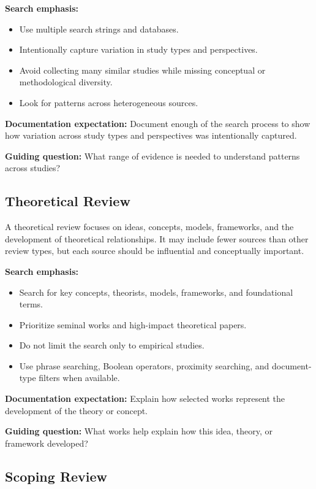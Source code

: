 \documentclass[11pt,letterpaper]{article}
\begin{document}
\textbf{Search emphasis:}

\begin{itemize}
  \item Use multiple search strings and databases.
  \item Intentionally capture variation in study types and perspectives.
  \item Avoid collecting many similar studies while missing conceptual or methodological diversity.
  \item Look for patterns across heterogeneous sources.
\end{itemize}

\textbf{Documentation expectation:} Document enough of the search process to show how variation across study types and perspectives was intentionally captured.

\textbf{Guiding question:} What range of evidence is needed to understand patterns across studies?

\subsection{Theoretical Review}

A theoretical review focuses on ideas, concepts, models, frameworks, and the development of theoretical relationships. It may include fewer sources than other review types, but each source should be influential and conceptually important.

\textbf{Search emphasis:}

\begin{itemize}
  \item Search for key concepts, theorists, models, frameworks, and foundational terms.
  \item Prioritize seminal works and high-impact theoretical papers.
  \item Do not limit the search only to empirical studies.
  \item Use phrase searching, Boolean operators, proximity searching, and document-type filters when available.
\end{itemize}

\textbf{Documentation expectation:} Explain how selected works represent the development of the theory or concept.

\textbf{Guiding question:} What works help explain how this idea, theory, or framework developed?

\subsection{Scoping Review}
\end{document}
